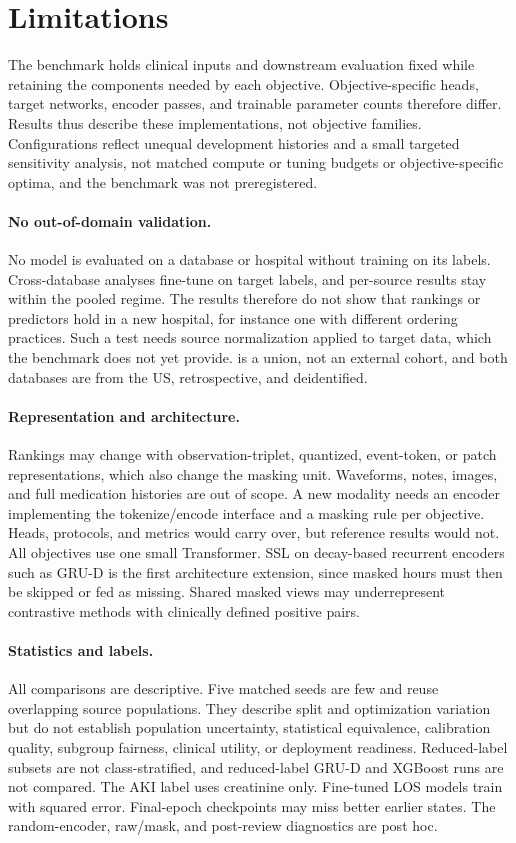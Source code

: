 \section{Limitations}
\label{sec:limitations}

The benchmark holds clinical inputs and downstream evaluation fixed while retaining the components needed by each objective. Objective-specific heads, target networks, encoder passes, and trainable parameter counts therefore differ. Results thus describe these implementations, not objective families. Configurations reflect unequal development histories and a small targeted sensitivity analysis, not matched compute or tuning budgets or objective-specific optima, and the benchmark was not preregistered.

\paragraph{No out-of-domain validation.}
No model is evaluated on a database or hospital without training on its labels. Cross-database analyses fine-tune on target labels, and per-source results stay within the pooled regime. The results therefore do not show that rankings or predictors hold in a new hospital, for instance one with different ordering practices. Such a test needs source normalization applied to target data, which the benchmark does not yet provide. \Combined{} is a union, not an external cohort, and both databases are from the US, retrospective, and deidentified.

\paragraph{Representation and architecture.}
Rankings may change with observation-triplet, quantized, event-token, or patch representations, which also change the masking unit. Waveforms, notes, images, and full medication histories are out of scope. A new modality needs an encoder implementing the tokenize/encode interface and a masking rule per objective. Heads, protocols, and metrics would carry over, but reference results would not. All objectives use one small Transformer. SSL on decay-based recurrent encoders such as GRU-D is the first architecture extension, since masked hours must then be skipped or fed as missing. Shared masked views may underrepresent contrastive methods with clinically defined positive pairs.

\paragraph{Statistics and labels.}
All comparisons are descriptive. Five matched seeds are few and reuse overlapping source populations. They describe split and optimization variation but do not establish population uncertainty, statistical equivalence, calibration quality, subgroup fairness, clinical utility, or deployment readiness. Reduced-label subsets are not class-stratified, and reduced-label GRU-D and XGBoost runs are not compared. The AKI label uses creatinine only. Fine-tuned LOS models train with squared error. Final-epoch checkpoints may miss better earlier states. The random-encoder, raw/mask, and post-review diagnostics are post hoc.

